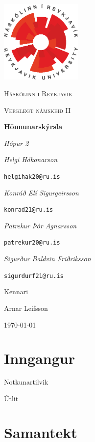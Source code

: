 \documentclass{scrartcl}
\begin{document}
\begin{titlepage}
	\centering
	\includegraphics[width=0.3\textwidth]{ru-logo.eps}\par\vspace{1cm} %
	{\scshape\LARGE Háskólinn í Reykjavík \par} %
	\vspace{1cm}
	{\scshape\Large Verklegt námskeið II\par} %
	\vspace{1.5cm}
	{\huge\bfseries Hönnunarskýrsla \par} %
	{\Large\itshape  Hópur 2 \par}
	\vspace{2cm}
	{\Large\itshape Helgi Hákonarson}\par %
	\texttt{helgihak20@ru.is}\par %
	\vspace{0.5cm}
	{\Large\itshape Konráð Elí Sigurgeirsson}\par %
	\texttt{konrad21@ru.is}\par %
	\vspace{0.5cm}
	{\Large\itshape Patrekur Þór Agnarsson}\par %
	\texttt{patrekur20@ru.is}\par %
	\vspace{0.5cm}
	{\Large\itshape Sigurður Baldvin Friðriksson}\par %
	\texttt{sigurdurf21@ru.is}\par %
	\vfill
	Kennari\par %
	Arnar Leifsson%
	\vfill

	{\large \today\par}
\end{titlepage}

\tableofcontents
\newpage


\section{Inngangur}

\begin{section}{Notkunartilvik}
\end{section}

\begin{section}{Útlit}
\end{section}

\section{Samantekt} 
\end{document}
